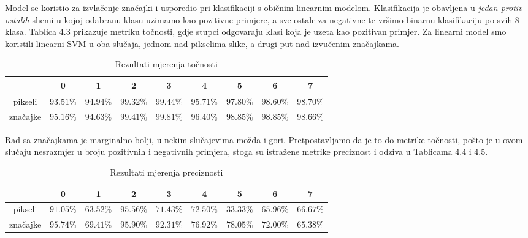\documentclass[times, utf8, diplomski]{fer}
\begin{document}
Model se koristio za izvlačenje značajki i usporedio pri klasifikaciji s običnim linearnim modelom. Klasifikacija je obavljena u \textit{jedan protiv ostalih} shemi u kojoj odabranu klasu uzimamo kao pozitivne primjere, a sve ostale za negativne te vršimo binarnu klasifikaciju po svih 8 klasa. Tablica 4.3 prikazuje metriku točnosti, gdje stupci odgovaraju klasi koja je uzeta kao pozitivan primjer. Za linearni model smo koristili linearni SVM u oba slučaja, jednom nad pikselima slike, a drugi put nad izvučenim značajkama.

\begin{table}[H]
\caption{Rezultati mjerenja točnosti}
\small
\centering
\begin{tabular}{c c c c c c c c c}
\hline\hline %
  & 0 & 1  & 2 & 3 & 4 & 5 & 6 & 7 \\ [0.5ex] 
\hline %
pikseli & $93.51\%$ & $94.94\%$ & $99.32\%$ & $99.44\%$ & $95.71\%$ & $97.80\%$ & $98.60\%$ & $98.70\%$ \\
značajke & $95.16\%$ & $94.63\%$ & $99.41\%$ & $99.81\%$ & $96.40\%$ & $98.85\%$ & $98.85\%$ & $98.66\%$ \\ [1ex] %
\hline %
\end{tabular}
\end{table}

Rad sa značajkama je marginalno bolji, u nekim slučajevima možda i gori. Pretpostavljamo da je to do metrike točnosti, pošto je u ovom slučaju nesrazmjer u broju pozitivnih i negativnih primjera, stoga su istražene metrike preciznost i odziva u Tablicama 4.4 i 4.5. \par

\begin{table}[H]
\caption{Rezultati mjerenja preciznosti}
\small
\centering
\begin{tabular}{c c c c c c c c c}
\hline\hline %
  & 0 & 1  & 2 & 3 & 4 & 5 & 6 & 7 \\ [0.5ex] 
\hline %
pikseli & $91.05\%$ & $63.52\%$ & $95.56\%$ & $71.43\%$ & $72.50\%$ & $33.33\%$ & $65.96\%$ & $66.67\%$ \\
značajke & $95.74\%$ & $69.41\%$ & $95.90\%$ & $92.31\%$ & $76.92\%$ & $78.05\%$ & $72.00\%$ & $65.38\%$ \\ [1ex] %
\hline %
\end{tabular}
\end{table}
\end{document}
